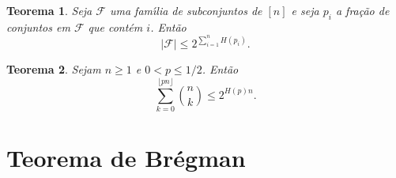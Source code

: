 \documentclass{amsart}
\theoremstyle{theorem}
\newtheorem{teorema}{Teorema}[section]
\theoremstyle{definition}
\theoremstyle{remark}
\numberwithin{equation}{section}
\begin{document}
\begin{teorema}
  Seja $\mathcal{F}$ uma fam\'{\i}lia de subconjuntos de $[n]$ e seja $p_i$ a fra\c{c}\~{a}o de conjuntos em $\mathcal{F}$ que cont\'{e}m $i$. Ent\~{a}o
  \begin{equation}
    |\mathcal{F}| \leq 2^{\sum_{i=1}^{n} H(p_i)}.
  \end{equation}
\end{teorema}


\begin{teorema}
  Sejam $n\geq 1$ e $0<p\leq 1/2$. Ent\~{a}o
  \begin{equation}
    \sum_{k=0}^{\lfloor pn \rfloor} \binom{n}{k} \leq 2^{H(p)n}.
  \end{equation}
\end{teorema}

\section{Teorema de Br\'{e}gman}
\end{document}
